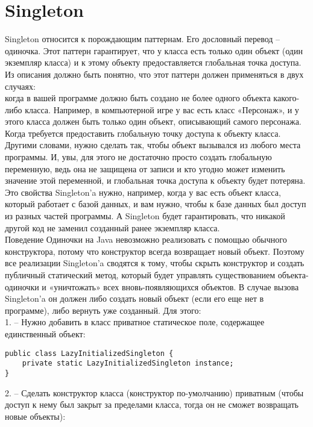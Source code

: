 {\section{Singleton}
Singleton относится к порождающим паттернам. Его дословный перевод – одиночка.  Этот паттерн гарантирует, что у класса есть только один объект (один экземпляр класса) и к этому объекту предоставляется глобальная точка доступа. Из описания должно быть понятно, что этот паттерн должен применяться в двух случаях: \\
когда в вашей программе должно быть создано не более одного объекта какого-либо класса. Например, в компьютерной игре у вас есть класс «Персонаж», и у этого класса должен быть только один объект, описывающий самого персонажа. \\
Когда требуется предоставить глобальную точку доступа к объекту класса. Другими словами, нужно сделать так, чтобы объект вызывался из любого места программы. И, увы, для этого не достаточно просто создать глобальную переменную, ведь она не защищена от записи и кто угодно может изменить значение этой переменной, и глобальная точка доступа к объекту будет потеряна. Это свойства Singleton'a нужно, например, когда у вас есть объект класса, который работает с базой данных, и вам нужно, чтобы к базе данных был доступ из разных частей программы. А Singleton будет гарантировать, что никакой другой код не заменил созданный ранее экземпляр класса. \\
Поведение Одиночки на Java невозможно реализовать с помощью обычного конструктора, потому что конструктор всегда возвращает новый объект. Поэтому все реализации Singleton’a сводятся к тому, чтобы скрыть конструктор и создать публичный статический метод, который будет управлять существованием объекта-одиночки и «уничтожать» всех вновь-появляющихся объектов. В случае вызова Singleton’a он должен либо создать новый объект (если его еще нет в программе), либо вернуть уже созданный. Для этого: \\   
1. – Нужно добавить в класс приватное статическое поле, содержащее единственный объект: 
\begin{lstlisting}
public class LazyInitializedSingleton {
	private static LazyInitializedSingleton instance; 
}
\end{lstlisting}
2. – Сделать конструктор класса (конструктор по-умолчанию) приватным (чтобы доступ к нему был закрыт за пределами класса, тогда он не сможет возвращать новые объекты): \\
\begin{lstlisting}

\end{lstlisting}}
